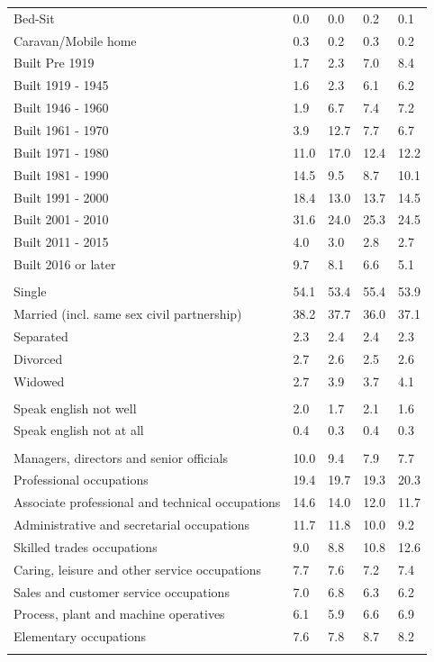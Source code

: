 \documentclass{article}
\begin{document}
\begin{table}[h]
\begin{tabular}{KTTTT}
Bed-Sit & 0.0& 0.0& 0.2& 0.1\\
Caravan/Mobile home & 0.3& 0.2& 0.3& 0.2\\
    \hline
Built Pre 1919 & 1.7& 2.3& 7.0& 8.4\\
Built 1919 - 1945 & 1.6& 2.3& 6.1& 6.2\\
Built  1946 - 1960 & 1.9& 6.7& 7.4& 7.2\\
Built  1961 - 1970 &  3.9& 12.7&  7.7&  6.7\\
Built  1971 - 1980 & 11.0& 17.0& 12.4& 12.2\\
Built  1981 - 1990 & 14.5&  9.5&  8.7& 10.1\\
Built  1991 - 2000 & 18.4& 13.0& 13.7& 14.5\\
Built  2001 - 2010 & 31.6& 24.0& 25.3& 24.5\\
Built  2011 - 2015 & 4.0& 3.0& 2.8& 2.7\\
Built  2016 or later & 9.7& 8.1& 6.6& 5.1\\
\hline
    \\
    \hline
Single & 54.1& 53.4& 55.4& 53.9\\
Married (incl. same sex civil partnership) & 38.2& 37.7& 36.0& 37.1\\
Separated  & 2.3& 2.4& 2.4& 2.3\\
Divorced  & 2.7& 2.6& 2.5& 2.6\\
Widowed & 2.7& 3.9& 3.7& 4.1\\
\hline
    \\ 
    \hline
Speak english not well & 2.0& 1.7& 2.1& 1.6\\
Speak english not at all & 0.4& 0.3& 0.4& 0.3\\
\hline
    \\
    \hline
Managers, directors and senior officials & 10.0&  9.4&  7.9&  7.7\\
Professional occupations & 19.4& 19.7& 19.3& 20.3\\
Associate professional and technical occupations & 14.6& 14.0& 12.0& 11.7\\
Administrative and secretarial occupations & 11.7& 11.8& 10.0&  9.2\\
Skilled trades occupations &  9.0&  8.8& 10.8& 12.6\\
Caring, leisure and other service occupations & 7.7& 7.6& 7.2& 7.4\\
Sales and customer service occupations & 7.0& 6.8& 6.3& 6.2\\
Process, plant and machine operatives & 6.1& 5.9& 6.6& 6.9\\
Elementary occupations & 7.6& 7.8& 8.7& 8.2\\
\hline
\end{tabular}
\end{table}
\end{document}

